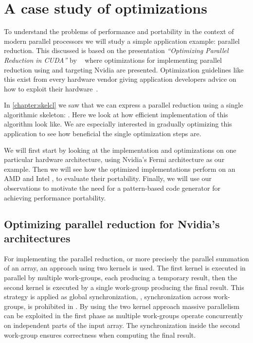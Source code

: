 \section{A case study of \OpenCL optimizations}
\label{sec:reduce:case-study}
To understand the problems of performance and portability in the context of modern parallel processors we will study a simple application example: parallel reduction.
This discussed is based on the presentation \emph{``Optimizing Parallel Reduction in CUDA''} by \citeauthor{Harris2007}~\cite{Harris2007} where optimizations for implementing parallel reduction using \CUDA and targeting Nvidia \GPUs are presented.
Optimization guidelines like this exist from every hardware vendor giving application developers advice on how to exploit their hardware~\cite{CUDAProgrammingGuide,AMDProgrammingGuide,IntelGPUProgrammingGuide,IntelXeonProgrammingGuide}.

In \autoref{chapter:skelcl} we saw that we can express a parallel reduction using a single algorithmic skeleton: \reduce.
Here we look at how efficient \OpenCL implementation of this algorithm look like.
We are especially interested in gradually optimizing this application to see how beneficial the single optimization steps are.

We will first start by looking at the implementation and optimizations on one particular hardware architecture, using Nvidia's Fermi \GPU architecture as our example.
Then we will see how the optimized implementations perform on an AMD \GPU and Intel \CPU, to evaluate their portability.
Finally, we will use our observations to motivate the need for a pattern-based code generator for achieving performance portability.


\subsection{Optimizing parallel reduction for Nvidia's \GPU architectures}
For implementing the parallel reduction, or more precisely the parallel summation of an array, an approach using two \OpenCL kernels is used.
The first \OpenCL kernel is executed in parallel by multiple \OpenCL work-groups, each producing a temporary result, then the second \OpenCL kernel is executed by a single \OpenCL work-group producing the final result.
This strategy is applied as global synchronization, \ie, synchronization across work-groups, is prohibited in \OpenCL.
By using the two kernel approach massive parallelism can be exploited in the first phase as multiple work-groups operate concurrently on independent parts of the input array.
The synchronization inside the second work-group ensures correctness when computing the final result.

